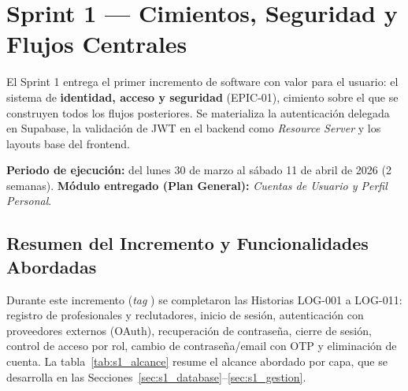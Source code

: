 \chapter{Sprint 1 — Cimientos, Seguridad y Flujos Centrales}
\label{cap:sprint1}

El Sprint 1 entrega el primer incremento de software con valor para el usuario: el sistema de
\textbf{identidad, acceso y seguridad} (EPIC-01), cimiento sobre el que se construyen todos los
flujos posteriores. Se materializa la autenticación delegada en Supabase, la validación de JWT
en el backend como \textit{Resource Server} y los layouts base del frontend.\par

\textbf{Periodo de ejecución:} del lunes 30 de marzo al sábado 11 de abril de 2026 (2 semanas).
\textbf{Módulo entregado (Plan General):} \textit{Cuentas de Usuario y Perfil Personal}.\par

\section{Resumen del Incremento y Funcionalidades Abordadas}
\label{sec:s1_resumen}

Durante este incremento (\textit{tag} ) se completaron las Historias
LOG-001 a LOG-011: registro de profesionales y reclutadores, inicio de sesión, autenticación con
proveedores externos (OAuth), recuperación de contraseña, cierre de sesión, control de acceso por
rol, cambio de contraseña/email con OTP y eliminación de cuenta. La tabla~\ref{tab:s1_alcance}
resume el alcance abordado por capa, que se desarrolla en las
Secciones~\ref{sec:s1_database}--\ref{sec:s1_gestion}.

